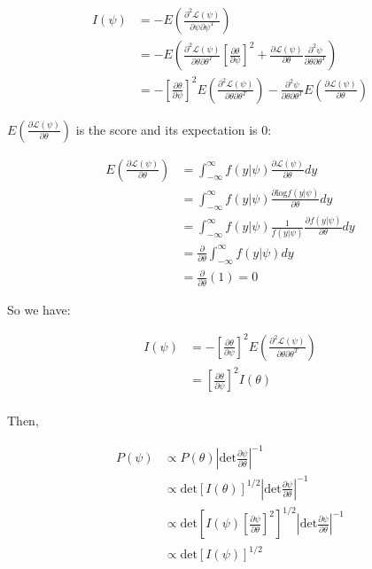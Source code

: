 \documentclass[11pt]{article}
\begin{document}
\begin{align*}
    I(\psi) &= -E\left(\frac{\partial ^2\mathcal{L}(\psi)}{\partial \psi \partial \psi^T}\right)\\
    &= -E\left(\frac{\partial^2\mathcal{L}(\psi)}{\partial \theta \partial \theta^T} \left[\frac{\partial \theta}{\partial \psi}\right]^2 + \frac{\partial \mathcal{L}(\psi)}{\partial \theta} \frac{\partial ^2\psi}{\partial \theta \partial \theta^T}\right)\\
     &= -\left[\frac{\partial \theta}{\partial \psi}\right]^2E\left(\frac{\partial^2\mathcal{L}(\psi)}{\partial \theta \partial \theta^T}\right)  -\frac{\partial ^2\psi}{\partial \theta \partial \theta^T}E\left(\frac{\partial \mathcal{L}(\psi)}{\partial \theta} \right)
\end{align*}

$E\left(\frac{\partial \mathcal{L}(\psi)}{\partial \theta} \right)$ is the score and its expectation is 0:

\begin{align*}
    E\left(\frac{\partial \mathcal{L}(\psi)}{\partial \theta} \right) &= \int^{\infty}_{-\infty} f(y|\psi)  \frac{\partial \mathcal{L}(\psi)}{\partial \theta} dy\\
    &= \int^{\infty}_{-\infty} f(y|\psi)  \frac{\partial \text{log}f(y|\psi) }{\partial \theta} dy\\
    &= \int^{\infty}_{-\infty} f(y|\psi) \frac{1}{f(y|\psi) }  \frac{\partial f(y|\psi) }{\partial \theta} dy\\
     &= \frac{\partial }{\partial \theta} \int^{\infty}_{-\infty}f(y|\psi) dy \\
     & = \frac{\partial }{\partial \theta} (1) = 0
\end{align*}

So we have:

\begin{align*}
    I(\psi) &=-\left[\frac{\partial \theta}{\partial \psi}\right]^2E\left(\frac{\partial^2\mathcal{L}(\psi)}{\partial \theta \partial \theta^T}\right)  \\
    &= \left[\frac{\partial \theta}{\partial \psi}\right]^2 I(\theta)\\
\end{align*}

Then, 

\begin{align*}
    P(\psi) &\propto P(\theta) \left|\text{det}\frac{\partial \psi}{\partial \theta}\right|^{-1}\\
    &\propto \text{det}[I(\theta)]^{1/2}\left|\text{det}\frac{\partial \psi}{\partial \theta}\right|^{-1}\\
     &\propto \text{det}\left[I(\psi)\left[\frac{\partial \psi}{\partial \theta}\right]^2\right]^{1/2}\left|\text{det}\frac{\partial \psi}{\partial \theta}\right|^{-1}\\
     &\propto \text{det}[I(\psi)]^{1/2}
\end{align*}
\end{document}
